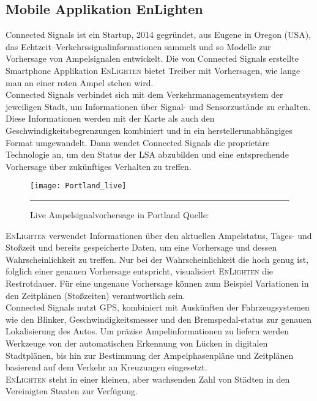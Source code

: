 \subsection*{Mobile Applikation EnLighten}
Connected Signals ist ein Startup, 2014 gegründet, aus Eugene in Oregon (USA), das Echtzeit--Verkehrssignalinformationen sammelt und so Modelle zur Vorhersage von Ampelsignalen entwickelt. Die von Connected Signals erstellte Smartphone Applikation \textsc{EnLighten} bietet Treiber mit Vorhersagen, wie lange man an einer roten Ampel stehen wird. \cite{connectedSignals} \\
Connected Signals verbindet sich mit dem Verkehrmanagementsystem der jeweiligen Stadt, um Informationen über Signal- und Sensorzustände zu erhalten. Diese Informationen werden mit der Karte als auch den Geschwindigkeitsbegrenzungen kombiniert und in ein herstellerunabhängiges Format umgewandelt. Dann wendet Connected Signals die proprietäre Technologie an, um den Status der \gls{LSA} abzubilden und eine entsprechende Vorhersage über zukünftiges Verhalten zu treffen. \cite{signals} 
\begin{figure}[t]
    \centering
    \texttt{[image: Portland\_live]} 
    \rule{35em}{0.5pt}
    \label{fig:enlighten}
    \caption[Connected Signals live Vorhersage]{Live Ampelsignalvorhersage in Portland Quelle: \cite{signals}}
\end{figure}
\textsc{EnLighten} verwendet Informationen über den aktuellen Ampelstatus, Tages- und Stoßzeit und bereits gespeicherte Daten, um eine Vorhersage und dessen Wahrscheinlichkeit zu treffen. Nur bei der Wahrscheinlichkeit die hoch genug ist, folglich einer genauen Vorhersage entspricht, visualisiert \textsc{EnLighten} die Restrotdauer. Für eine ungenaue Vorhersage können zum Beispiel Variationen in den Zeitplänen (Stoßzeiten) verantwortlich sein.\\  
Connected Signals nutzt \gls{GPS}, kombiniert mit Auskünften der Fahrzeugsystemen wie den Blinker, Geschwindigkeitsmesser und den Bremspedal-status zur genauen Lokalisierung des Autos. Um präzise Ampelinformationen zu liefern werden Werkzeuge von der automatischen Erkennung von Lücken in digitalen Stadtplänen, bis hin zur Bestimmung der Ampelphasenpläne und Zeitplänen basierend auf dem Verkehr an Kreuzungen eingesetzt. \cite{EnLighten} \\
\textsc{EnLighten} steht in einer kleinen, aber wachsenden Zahl von Städten in den Vereinigten Staaten zur Verfügung. 
